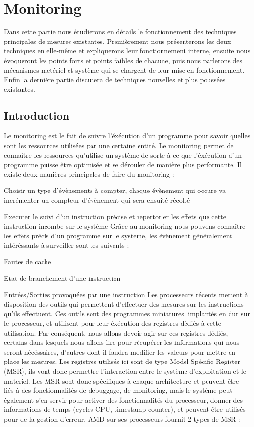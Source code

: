 \chapter{Monitoring}
	Dans cette partie nous étudierons en détails le fonctionnement des techniques principales de mesures existantes. Premièrement nous présenterons les deux techniques en elle-même et expliquerons leur fonctionnement interne, ensuite nous évoqueront les points forts et points faibles de chacune, puis nous parlerons des mécanismes metériel et système qui se chargent de leur mise en fonctionnement. Enfin la dernière partie discutera de techniques nouvelles et plus poussées existantes.
	\section{Introduction}
		Le monitoring est le fait de suivre l'éxécution d'un programme pour savoir quelles sont les ressources utilisées par une certaine entité. Le monitoring permet de connaître les ressources qu'utilise un système de sorte à ce que l'éxécution d'un programme puisse être optimisée et se dérouler de manière plus performante. Il existe deux manières principales de faire du monitoring : 
		\benum
			\item{Choisir un type d'évènements à compter, chaque évènement qui occure va incrémenter un compteur d'évènement qui sera ensuité récolté}
			\item{Executer le suivi d'un instruction précise et repertorier les effets que cette instruction incombe sur le système}
		\eenum
		Grâce au monitoring nous pouvons connaître les effets précis d'un programme sur le systeme, les évènement généralement intéréssants à surveiller sont les suivants :
		\benum
			\item{Fautes de cache}
			\item{Etat de branchement d'une instruction}
			\item{Entrées/Sorties provoquées par une instruction}
		\eenum
		Les processeurs récents mettent à disposition des outils qui permettent d'effectuer des mesures sur les instructions qu'ils effectuent. Ces outils sont des programmes miniatures, implantés en dur sur le processeur, et utilisent pour leur éxécution des registres dédiés à cette utilisation. Par conséquent, nous allons devoir agir sur ces registres dédiés, certains dans lesquels nous allons lire pour récupérer les informations qui nous seront nécéssaires, d'autres dont il faudra modifier les valeurs pour mettre en place les mesures. Les registres utilisés ici sont de type Model Spécific Register (MSR), ils vont donc permettre l'interaction entre le système d'exploitation et le materiel. Les MSR sont donc spécifiques à chaque architecture et peuvent être liés à des fonctionnalités de debuggage, de monitoring, mais le système peut également s'en servir pour activer des fonctionnalités du processeur, donner des informations de temps (cycles CPU, timestamp counter), et peuvent être utilisés pour de la gestion d'erreur. AMD sur ses processeurs fournit 2 types de MSR : 
